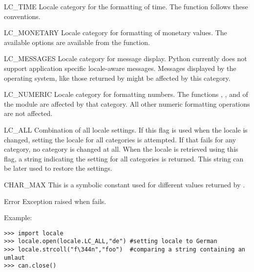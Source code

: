 \begin{datadesc}{LC_TIME}
Locale category for the formatting of time. The function
 follows these conventions.
\end{datadesc}

\begin{datadesc}{LC_MONETARY}
Locale category for formatting of monetary values. The available
options are available from the  function.
\end{datadesc}

\begin{datadesc}{LC_MESSAGES}
Locale category for message display. Python currently does not support
application specific locale-aware messages. Messages displayed by the
operating system, like those returned by  might
be affected by this category.
\end{datadesc}

\begin{datadesc}{LC_NUMERIC}
Locale category for formatting numbers. The functions
, ,  and  of the
 module are affected by that category. All other numeric
formatting operations are not affected.
\end{datadesc}

\begin{datadesc}{LC_ALL}
Combination of all locale settings. If this flag is used when the
locale is changed, setting the locale for all categories is
attempted. If that fails for any category, no category is changed at
all. When the locale is retrieved using this flag, a string indicating
the setting for all categories is returned. This string can be later
used to restore the settings.
\end{datadesc}

\begin{datadesc}{CHAR_MAX}
This is a symbolic constant used for different values returned by
.
\end{datadesc}

\begin{excdesc}{Error}
Exception raised when  fails.
\end{excdesc}

Example:

\begin{verbatim}
>>> import locale
>>> locale.open(locale.LC_ALL,"de") #setting locale to German
>>> locale.strcoll("f\344n","foo")  #comparing a string containing an umlaut 
>>> can.close()
\end{verbatim}


